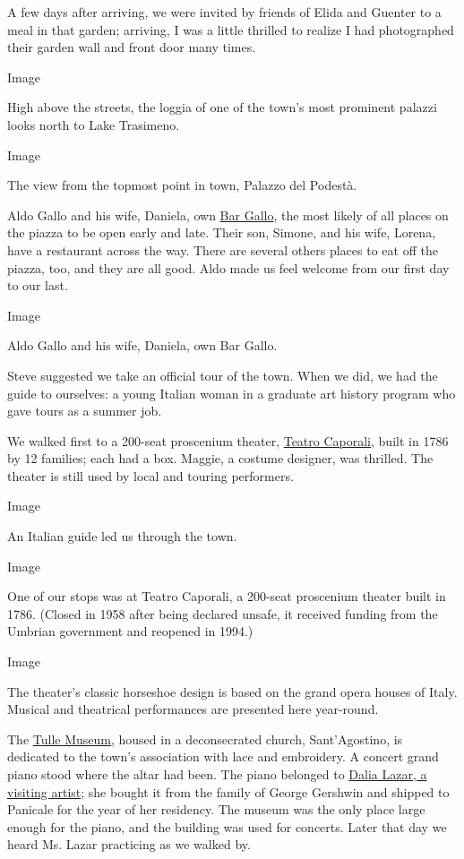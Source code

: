 A few days after arriving, we were invited by friends of Elida and
Guenter to a meal in that garden; arriving, I was a little thrilled to
realize I had photographed their garden wall and front door many times.

Image

High above the streets, the loggia of one of the town's most prominent
palazzi looks north to Lake Trasimeno.

Image

The view from the topmost point in town, Palazzo del Podestà.

Aldo Gallo and his wife, Daniela, own
\href{https://goo.gl/maps/qadL6PgxrYhmUg5s6}{Bar Gallo}, the most likely
of all places on the piazza to be open early and late. Their son,
Simone, and his wife, Lorena, have a restaurant across the way. There
are several others places to eat off the piazza, too, and they are all
good. Aldo made us feel welcome from our first day to our last.

Image

Aldo Gallo and his wife, Daniela, own Bar Gallo.

Steve suggested we take an official tour of the town. When we did, we
had the guide to ourselves: a young Italian woman in a graduate art
history program who gave tours as a summer job.

We walked first to a 200-seat proscenium theater,
\href{https://www.teatrostabile.umbria.it/teatro/teatro-caporali/}{Teatro
Caporali}, built in 1786 by 12 families; each had a box. Maggie, a
costume designer, was thrilled. The theater is still used by local and
touring performers.

Image

An Italian guide led us through the town.

Image

One of our stops was at Teatro Caporali, a 200-seat proscenium theater
built in 1786. (Closed in 1958 after being declared unsafe, it received
funding from the Umbrian government and reopened in 1994.)

Image

The theater's classic horseshoe design is based on the grand opera
houses of Italy. Musical and theatrical performances are presented here
year-round.

The \href{https://goo.gl/maps/S8NSxw9ongY7jzqWA}{Tulle Museum}, housed
in a deconsecrated church, Sant'Agostino, is dedicated to the town's
association with lace and embroidery. A concert grand piano stood where
the altar had been. The piano belonged to
\href{https://www.youtube.com/watch?v=RI0B1QOdKww}{Dalia Lazar, a
visiting artist}; she bought it from the family of George Gershwin and
shipped to Panicale for the year of her residency. The museum was the
only place large enough for the piano, and the building was used for
concerts. Later that day we heard Ms. Lazar practicing as we walked by.


